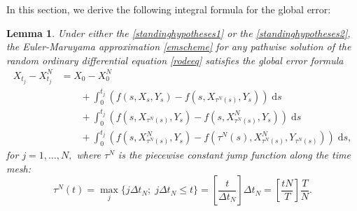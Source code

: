 \documentclass[reqno,12pt]{amsart}
\theoremstyle{plain}%
\newtheorem{lem}{Lemma}[section]
\theoremstyle{definition}
\begin{document}
In this section, we derive the following integral formula for the global error:
\begin{lem}
    Under either the \cref{standinghypotheses1} or the \cref{standinghypotheses2}, the Euler-Maruyama approximation \eqref{emscheme} for any pathwise solution of the random ordinary differential equation \eqref{rodeeq} satisfies the global error formula
    \begin{equation}
        \label{globalerrorintegralformula}
        \begin{aligned}
            X_{t_j} - X_{t_j}^N & = X_0 - X_0^N \\
            & \qquad + \int_0^{t_j} \left( f(s, X_s, Y_s) - f(s, X_{\tau^N(s)}, Y_s) \right)\;\mathrm{d}s  \\ 
            & \qquad + \int_{0}^{t_j} \left( f(s, X_{\tau^N(s)}, Y_s) - f(s, X_{\tau^N(s)}^N, Y_s) \right)\;\mathrm{d}s \\
            & \qquad + \int_0^{t_j} \left( f(s, X_{\tau^N(s)}^N, Y_s) - f(\tau^N(s), X_{\tau^N(s)}^N, Y_{\tau^N(s)}) \right)\;\mathrm{d}s,
        \end{aligned}
    \end{equation}
    for $j = 1, \ldots, N,$ where $\tau^N$ is the piecewise constant jump function along the time mesh:
    \begin{equation}
        \label{tauNt}
        \tau^N(t) = \max_j\{j\Delta t_N; \; j\Delta t_N \leq t\} = \left[\frac{t}{\Delta t_N}\right]\Delta t_N = \left[\frac{tN}{T}\right]\frac{T}{N}.
    \end{equation}
\end{lem}
\end{document}
